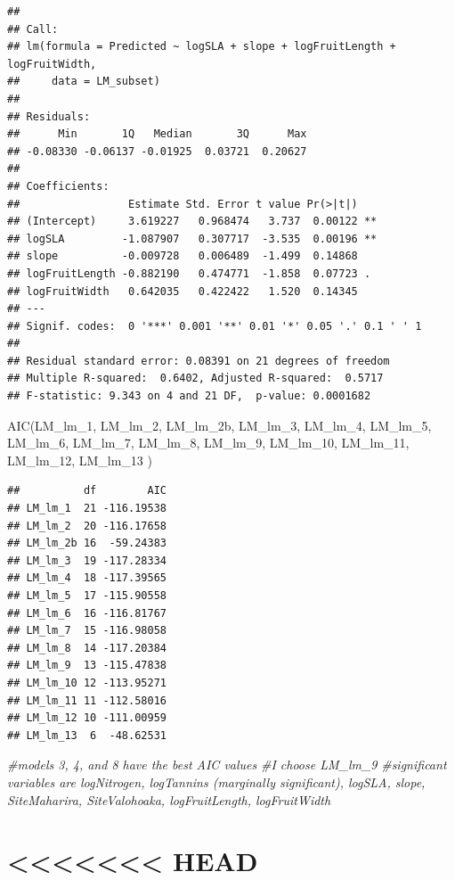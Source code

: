 \documentclass[
  12pt,
]{article}
\newenvironment{Shaded}{\begin{snugshade}}{\end{snugshade}}
\newcommand{\CommentTok}[1]{\textcolor[rgb]{0.56,0.35,0.01}{\textit{#1}}}
\newcommand{\FunctionTok}[1]{\textcolor[rgb]{0.00,0.00,0.00}{#1}}
\newcommand{\NormalTok}[1]{#1}
\begin{document}
\begin{verbatim}
## 
## Call:
## lm(formula = Predicted ~ logSLA + slope + logFruitLength + logFruitWidth, 
##     data = LM_subset)
## 
## Residuals:
##      Min       1Q   Median       3Q      Max 
## -0.08330 -0.06137 -0.01925  0.03721  0.20627 
## 
## Coefficients:
##                 Estimate Std. Error t value Pr(>|t|)   
## (Intercept)     3.619227   0.968474   3.737  0.00122 **
## logSLA         -1.087907   0.307717  -3.535  0.00196 **
## slope          -0.009728   0.006489  -1.499  0.14868   
## logFruitLength -0.882190   0.474771  -1.858  0.07723 . 
## logFruitWidth   0.642035   0.422422   1.520  0.14345   
## ---
## Signif. codes:  0 '***' 0.001 '**' 0.01 '*' 0.05 '.' 0.1 ' ' 1
## 
## Residual standard error: 0.08391 on 21 degrees of freedom
## Multiple R-squared:  0.6402, Adjusted R-squared:  0.5717 
## F-statistic: 9.343 on 4 and 21 DF,  p-value: 0.0001682
\end{verbatim}

\begin{Shaded}
\begin{Highlighting}[]
\FunctionTok{AIC}\NormalTok{(LM\_lm\_1, LM\_lm\_2, LM\_lm\_2b, LM\_lm\_3, LM\_lm\_4, LM\_lm\_5, LM\_lm\_6, LM\_lm\_7, LM\_lm\_8, LM\_lm\_9, LM\_lm\_10, LM\_lm\_11, LM\_lm\_12, LM\_lm\_13 )}
\end{Highlighting}
\end{Shaded}

\begin{verbatim}
##          df        AIC
## LM_lm_1  21 -116.19538
## LM_lm_2  20 -116.17658
## LM_lm_2b 16  -59.24383
## LM_lm_3  19 -117.28334
## LM_lm_4  18 -117.39565
## LM_lm_5  17 -115.90558
## LM_lm_6  16 -116.81767
## LM_lm_7  15 -116.98058
## LM_lm_8  14 -117.20384
## LM_lm_9  13 -115.47838
## LM_lm_10 12 -113.95271
## LM_lm_11 11 -112.58016
## LM_lm_12 10 -111.00959
## LM_lm_13  6  -48.62531
\end{verbatim}

\begin{Shaded}
\begin{Highlighting}[]
\CommentTok{\#models 3, 4, and 8 have the best AIC values}
\CommentTok{\#I choose LM\_lm\_9}
\CommentTok{\#significant variables are logNitrogen, logTannins (marginally significant), logSLA, slope, SiteMaharira, SiteValohoaka, logFruitLength, logFruitWidth}
\end{Highlighting}
\end{Shaded}

\hypertarget{head}{%
\section{\textless\textless\textless\textless\textless\textless\textless{}
HEAD}\label{head}}
\end{document}

